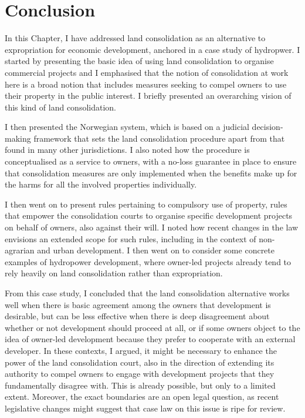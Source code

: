 \section{Conclusion}\label{sec:conc}

In this Chapter, I have addressed land consolidation as an alternative to expropriation for economic development, anchored in a case study of hydropwer. I started by presenting the basic idea of using land consolidation to organise commercial projects and I emphasised that the notion of consolidation at work here is a broad notion that includes measures seeking to compel owners to use their property in the public interest. I briefly presented an overarching vision of this kind of land consolidation.

I then presented the Norwegian system, which is based on a judicial decision-making framework that sets the land consolidation procedure apart from that found in many other jurisdictions. I also noted how the procedure is conceptualised as a service to owners, with a no-loss guarantee in place to ensure that consolidation measures are only implemented when the benefits make up for the harms for all the involved properties individually.

I then went on to present rules pertaining to compulsory use of property, rules that empower the consolidation courts to organise specific development projects on behalf of owners, also against their will. I noted how recent changes in the law envisions an extended scope for such rules, including in the context of non-agrarian and urban development. I then went on to consider some concrete examples of hydropower development, where owner-led projects already tend to rely heavily on land consolidation rather than expropriation.

From this case study, I concluded that the land consolidation alternative works well when there is basic agreement among the owners that development is desirable, but can be less effective when there is deep disagreement about whether or not development should proceed at all, or if some owners object to the idea of owner-led development because they prefer to cooperate with an external developer. In these contexts, I argued, it might be necessary to enhance the power of the land consolidation court, also in the direction of extending its authority to compel owners to engage with development projects that they fundamentally disagree with. This is already possible, but only to a limited extent. Moreover, the exact boundaries are an open legal question, as recent legislative changes might suggest that case law on this issue is ripe for review.

